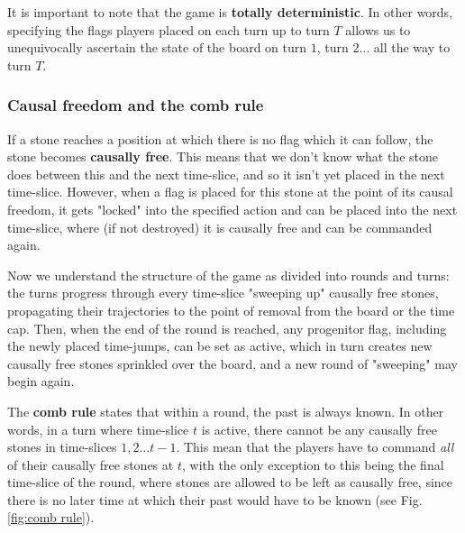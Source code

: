 \documentclass[12pt]{article}
\begin{document}
	It is important to note that the game is \textbf{totally deterministic}. In other words, specifying the flags players placed on each turn up to turn $T$ allows us to unequivocally ascertain the state of the board on turn $1$, turn $2\dots$ all the way to turn $T$.
	
	\subsubsection{Causal freedom and the comb rule}\label{sec:causal freedom}
	If a stone reaches a position at which there is no flag which it can follow, the stone becomes \textbf{causally free}. This means that we don't know what the stone does between this and the next time-slice, and so it isn't yet placed in the next time-slice. However, when a flag is placed for this stone at the point of its causal freedom, it gets "locked" into the specified action and can be placed into the next time-slice, where (if not destroyed) it is causally free and can be commanded again.
	
	Now we understand the structure of the game as divided into rounds and turns: the turns progress through every time-slice "sweeping up" causally free stones, propagating their trajectories to the point of removal from the board or the time cap. Then, when the end of the round is reached, any progenitor flag, including the newly placed time-jumps, can be set as active, which in turn creates new causally free stones sprinkled over the board, and a new round of "sweeping" may begin again.
	
	The \textbf{comb rule} states that within a round, the past is always known. In other words, in a turn where time-slice $t$ is active, there cannot be any causally free stones in time-slices $1, 2\dots t-1$. This mean that the players have to command \textit{all} of their causally free stones at $t$, with the only exception to this being the final time-slice of the round, where stones are allowed to be left as causally free, since there is no later time at which their past would have to be known (see Fig. \ref{fig:comb rule}).
	
\end{document}
